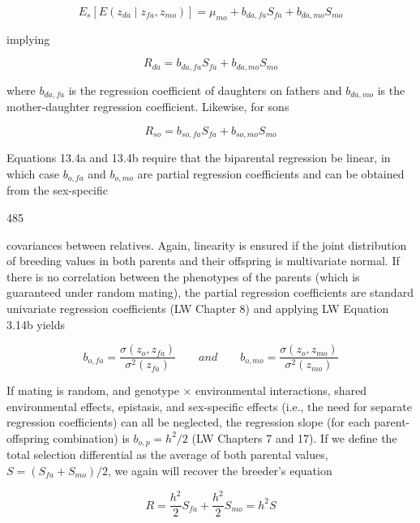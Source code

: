 \documentclass{article}
\begin{document}
\begin{equation}
E_{s}\left[E(z_{d a}\mid z_{f a},z_{m o})\right]=\mu_{m o}+b_{d a,f a}S_{f a}+b_{d a,m o}S_{m o}
\end{equation}

implying

\begin{equation}
R_{da}=b_{da,fa}S_{fa}+b_{da,mo}S_{mo}
\tag{13.4a}
\label{eq:13_4a}
\end{equation}

where  $ b_{da,fa} $ is the regression coefficient of daughters on fathers and  $ b_{da,mo} $ is the mother-daughter regression coefficient. Likewise, for sons

\begin{equation}
R_{s o}=b_{s o,f a}S_{f a}+b_{s o,m o}S_{m o}
\tag{13.4b}
\label{eq:13_4b}
\end{equation}

Equations 13.4a and 13.4b require that the biparental regression be linear, in which case  $ b_{o,fa} $ and  $ b_{o,mo} $ are partial regression coefficients and can be obtained from the sex-specific

485

covariances between relatives. Again, linearity is ensured if the joint distribution of breeding values in both parents and their offspring is multivariate normal. If there is no correlation between the phenotypes of the parents (which is guaranteed under random mating), the partial regression coefficients are standard univariate regression coefficients (LW Chapter 8) and applying LW Equation 3.14b yields

\begin{equation}
b_{o,fa}=\frac{\sigma(z_{o},z_{fa})}{\sigma^{2}(z_{fa})}\qquad and\qquad b_{o,mo}=\frac{\sigma(z_{o},z_{mo})}{\sigma^{2}(z_{mo})}
\end{equation}

If mating is random, and genotype × environmental interactions, shared environmental effects, epistasis, and sex-specific effects (i.e., the need for separate regression coefficients) can all be neglected, the regression slope (for each parent-offspring combination) is  $ b_{o,p} = h^{2}/2 $ (LW Chapters 7 and 17). If we define the total selection differential as the average of both parental values,  $ S = (S_{fa} + S_{mo})/2 $, we again will recover the breeder's equation

\begin{equation}
R=\frac{h^{2}}{2}S_{fa}+\frac{h^{2}}{2}S_{mo}=h^{2}S
\tag{13.5}
\label{eq:13_5}
\end{equation}
\end{document}

